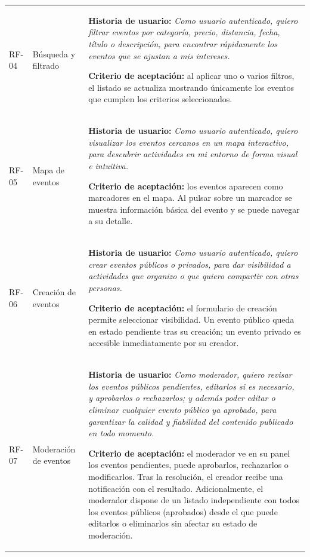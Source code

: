 {\begin{longtable}{@{}>{\raggedright\arraybackslash}p{} >{\raggedright\arraybackslash}p{} >{\raggedright\arraybackslash}p{}@{}}
RF-04 & Búsqueda y filtrado & \textbf{Historia de usuario:} \textit{Como usuario autenticado, quiero filtrar eventos por categoría, precio, distancia, fecha, título o descripción, para encontrar rápidamente los eventos que se ajustan a mis intereses.}\par\vspace{0.05cm}\textbf{Criterio de aceptación:} al aplicar uno o varios filtros, el listado se actualiza mostrando únicamente los eventos que cumplen los criterios seleccionados. \\
\addlinespace
RF-05 & Mapa de eventos & \textbf{Historia de usuario:} \textit{Como usuario autenticado, quiero visualizar los eventos cercanos en un mapa interactivo, para descubrir actividades en mi entorno de forma visual e intuitiva.}\par\vspace{0.05cm}\textbf{Criterio de aceptación:} los eventos aparecen como marcadores en el mapa. Al pulsar sobre un marcador se muestra información básica del evento y se puede navegar a su detalle. \\
\addlinespace
RF-06 & Creación de eventos & \textbf{Historia de usuario:} \textit{Como usuario autenticado, quiero crear eventos públicos o privados, para dar visibilidad a actividades que organizo o que quiero compartir con otras personas.}\par\vspace{0.05cm}\textbf{Criterio de aceptación:} el formulario de creación permite seleccionar visibilidad. Un evento público queda en estado pendiente tras su creación; un evento privado es accesible inmediatamente por su creador. \\
\addlinespace
RF-07 & Moderación de eventos & \textbf{Historia de usuario:} \textit{Como moderador, quiero revisar los eventos públicos pendientes, editarlos si es necesario, y aprobarlos o rechazarlos; y además poder editar o eliminar cualquier evento público ya aprobado, para garantizar la calidad y fiabilidad del contenido publicado en todo momento.}\par\vspace{0.05cm}\textbf{Criterio de aceptación:} el moderador ve en su panel los eventos pendientes, puede aprobarlos, rechazarlos o modificarlos. Tras la resolución, el creador recibe una notificación con el resultado. Adicionalmente, el moderador dispone de un listado independiente con todos los eventos públicos (aprobados) desde el que puede editarlos o eliminarlos sin afectar su estado de moderación. \\

\end{longtable}}
